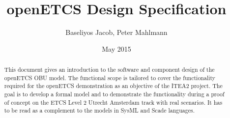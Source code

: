 \documentclass{template/openetcs_report}
\begin{document}
\frontmatter
{}

\newcommand{\define}[1]{\index{#1}\emph{#1}}







\title{openETCS Design Specification}

\date{May 2015}








\author{Baseliyos Jacob, Peter Mahlmann}





\newpage


\begin{abstract}
This document gives an introduction to the software and component design of the openETCS OBU model. The functional scope is tailored to cover the functionality required for the openETCS demonstration as an objective of the ITEA2 project. The goal is to develop a formal model and to demonstrate the functionality during a proof of concept on the ETCS Level 2 Utrecht Amsterdam track with real scenarios. It has to be read as a complement to the models in SysML and Scade languages. 
\end{abstract}

\maketitle
\end{document}
